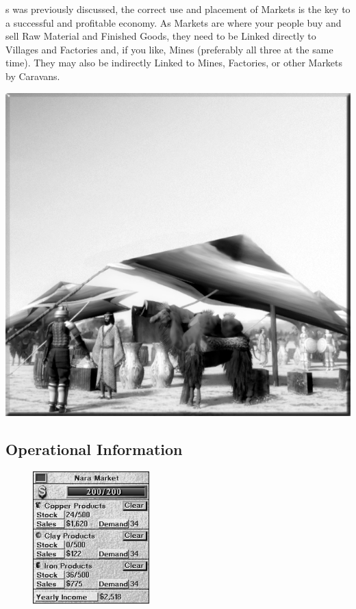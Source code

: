 
s was previously discussed, the correct use and placement of Markets is the key to a successful and profitable economy. As Markets are where your people buy and sell Raw Material and Finished Goods, they need to be Linked directly to Villages and Factories and, if you like, Mines (preferably all three at the same time). They may also be indirectly Linked to Mines, Factories, or other Markets by Caravans.

\begin{center}
	\includegraphics[width=0.9\linewidth]{Amarket}
\end{center}

\subsection{Operational Information}


\begin{figure}
	\vspace{-20pt}
	\begin{center}
		\includegraphics[width=0.4\textwidth]{Imarketinfo}
	\end{center}
	\vspace{-20pt}
\end{figure}

